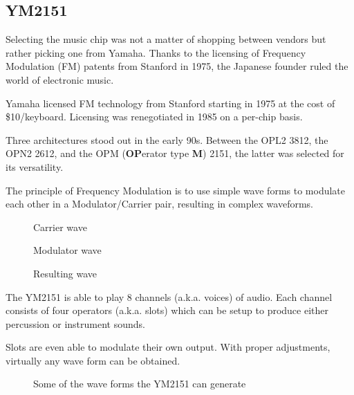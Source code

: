 \subsection{YM2151}

Selecting the music chip was not a matter of shopping between vendors but rather picking one from Yamaha. Thanks to the licensing of Frequency Modulation (FM) patents from Stanford in 1975, the Japanese founder ruled the world of electronic music.

\begin{trivia}
Yamaha licensed FM technology from Stanford starting in 1975 at the cost of \$10/keyboard. Licensing was renegotiated in 1985 on a per-chip basis\cite{fm_licensing}.

\end{trivia}
Three architectures stood out in the early 90s. Between the OPL2 3812, the OPN2 2612, and the OPM (\textbf{OP}erator type \textbf{M}) 2151, the latter was selected for its versatility. 



The principle of Frequency Modulation is to use simple wave forms to modulate each other in a Modulator/Carrier pair, resulting in complex waveforms\cite{fmProgramming}.

\begin{figure}[H]
\caption*{Carrier wave}
\end{figure}

\begin{figure}[H]
\caption*{Modulator wave}
\end{figure}

\begin{figure}[H]
\caption*{Resulting wave}
\end{figure}







The YM2151 is able to play 8 channels (a.k.a. voices) of audio. Each channel consists of four operators (a.k.a. slots) which can be setup to produce either percussion or instrument sounds.  

Slots are even able to modulate their own output. With proper adjustments, virtually any wave form can be obtained. 
 
\begin{figure}[H]
\caption*{Some of the wave forms the YM2151 can generate}
\end{figure}


